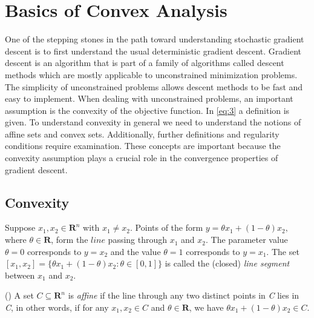 \section{Basics of Convex Analysis}
One of the stepping stones in the path toward understanding stochastic gradient descent is to first understand the usual deterministic gradient descent. Gradient descent is an algorithm that is part of a family of algorithms called descent methods which are mostly applicable to unconstrained minimization problems. The simplicity of unconstrained problems allows descent methods to be fast and easy to implement. When dealing with unconstrained problems, an important assumption is the convexity of the objective function. In \ref{eq:3} a definition is given. To understand convexity in general we need to understand the notions of affine sets and convex sets. Additionally, further definitions and regularity conditions require examination. These concepts are important because the convexity assumption plays a crucial role in the convergence properties of gradient descent. 
\subsection{Convexity}
\begin{definition}
Suppose $x_{1},x_{2} \in \mathbf{R}^{n}$ with $x_{1} \neq x_{2}$. Points of the form $y = \theta x_{1} + (1-\theta) x_{2},$ where $\theta \in \mathbf{R}$, form the $\textit{line}$ passing through $x_{1}$ and $x_{2}$. The parameter value $\theta = 0$ corresponds to $y = x_{2}$ and the value $\theta = 1$ corresponds to $y = x_{1}$. The set $[x_{1},x_{2}] = \{\theta x_{1} + (1-\theta) x_{2}: \theta \in [0,1]\}$ is called the (closed) \textit{line segment} between $x_{1}$ and $x_{2}$.
\end{definition}

\begin{definition}
(\cite[21]{boyd2004convex})
A set $C \subseteq \mathbf{R}^{n}$ is \textit{affine} if the line through any two distinct points in \textit{C} lies in \textit{C}, in other words, if for any $x_{1}, x_{2} \in C$ and $\theta \in \mathbf{R}$, we have $\theta x_{1} + (1-\theta) x_{2} \in C$.
\end{definition}


